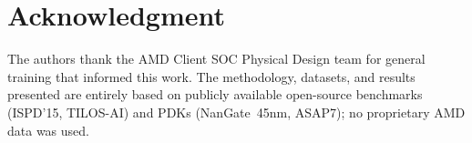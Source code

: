 \documentclass[journal,onecolumn,11pt]{IEEEtran}
\begin{document}






\section*{Acknowledgment}
The authors thank the AMD Client SOC Physical Design team for general training that informed this work. The methodology, datasets, and results presented are entirely based on publicly available open-source benchmarks (ISPD'15, TILOS-AI) and PDKs (NanGate~45nm, ASAP7); no proprietary AMD data was used.



\end{document}
